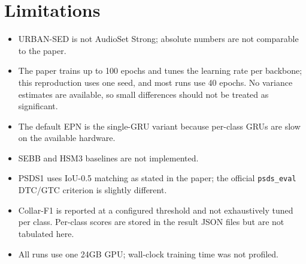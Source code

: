 \section{Limitations}

\begin{itemize}
\item URBAN-SED is not AudioSet Strong; absolute numbers are not comparable to
      the paper.
\item The paper trains up to 100 epochs and tunes the learning rate per
      backbone; this reproduction uses one seed, and most runs use 40 epochs.
      No variance estimates are available, so small differences should not be
      treated as significant.
\item The default EPN is the single-GRU variant because per-class GRUs are slow
      on the available hardware.
\item SEBB and HSM3 baselines are not implemented.
\item PSDS1 uses IoU-0.5 matching as stated in the paper; the official
      \texttt{psds\_eval} DTC/GTC criterion is slightly different.
\item Collar-F1 is reported at a configured threshold and not exhaustively
      tuned per class. Per-class scores are stored in the result JSON files but
      are not tabulated here.
\item All runs use one 24GB GPU; wall-clock training time was not profiled.
\end{itemize}
